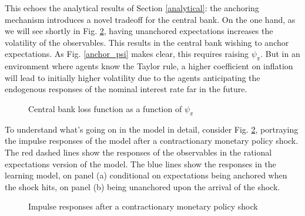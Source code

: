 \documentclass[11pt]{article}
\def \myFigPath {../../figures/}
\renewcommand{\[}{\begin{equation}}
\renewcommand{\]}{\end{equation}}
\def\mySmallerFigScale{0.18}
\begin{document}
This echoes the analytical results of Section \ref{analytical}: the anchoring mechanism introduces a novel tradeoff for the central bank. On the one hand, as we will see shortly in Fig. \ref{IRF}, having unanchored expectations increases the volatility of the observables. This results in the central bank wishing to anchor expectations. As Fig. \ref{anchor_psi} makes clear, this requires raising $\psi_{\pi}$. But in an environment where agents know the Taylor rule, a higher coefficient on inflation will lead to initially higher volatility due to the agents anticipating the endogenous responses of the nominal interest rate far in the future.
\begin{figure}[h!]
\caption{Central bank loss function as a function of $\psi_{\pi}$}
\floatfoot{}
\label{fig_loss}
\end{figure}

To understand what's going on in the model in detail, consider Fig. \ref{IRF}, portraying the impulse responses of the model after a contractionary monetary policy shock. The red dashed lines show the responses of the observables in the rational expectations version of the model. The blue lines show the responses in the learning model, on panel (a) conditional on expectations being anchored when the shock hits, on panel (b) being unanchored upon the arrival of the shock. 
\begin{figure}[h!]
\caption{Impulse responses after a contractionary monetary policy shock}
\label{IRF}
\end{figure}
\end{document}
